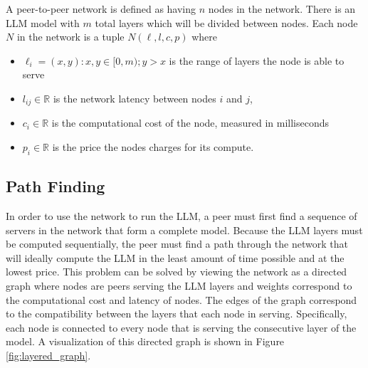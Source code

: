 \documentclass[preprint,twoside,11pt]{article}
\begin{document}
A peer-to-peer network is defined as having $n$ nodes in the network. There is an LLM model with $m$ total layers which will be divided between nodes.
Each node $N$ in the network is a tuple $N(\ell, l, c, p)$ where
\begin{itemize}
	\item $\ell _i = (x,y) : x,y \in [0,m); y > x$ is the range of layers the node is able to serve
	\item $l_{ij} \in \mathbb{R}$ is the network latency between nodes $i$ and $j$,
	\item $c_i \in \mathbb{R}$ is the computational cost of the node, measured in milliseconds
	\item $p_i \in \mathbb{R}$ is the price the nodes charges for its compute.
\end{itemize}

\subsection{Path Finding}

In order to use the network to run the LLM, a peer must first find a sequence of servers in the network that form a complete model.
Because the LLM layers must be computed sequentially, the peer must find a path through the network that will ideally compute
the LLM in the least amount of time possible and at the lowest price. This problem can be solved by viewing the network as a directed graph where nodes are peers serving the LLM layers and weights correspond
to the computational cost and latency of nodes. The edges of the graph correspond to the compatibility between the layers that each node in serving.
Specifically, each node is connected to every node that is serving the consecutive layer of the model. A visualization of this directed graph is shown in Figure \ref{fig:layered_graph}.
\end{document}
